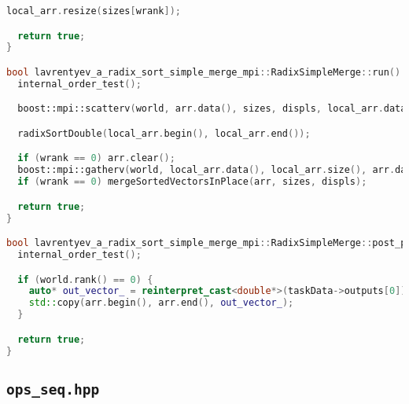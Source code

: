\documentclass[12pt]{article}
\begin{document}
\begin{lstlisting}[language=C++]
  local_arr.resize(sizes[wrank]);

  return true;
}

bool lavrentyev_a_radix_sort_simple_merge_mpi::RadixSimpleMerge::run() {
  internal_order_test();

  boost::mpi::scatterv(world, arr.data(), sizes, displs, local_arr.data(), sizes[wrank], 0);

  radixSortDouble(local_arr.begin(), local_arr.end());

  if (wrank == 0) arr.clear();
  boost::mpi::gatherv(world, local_arr.data(), local_arr.size(), arr.data(), sizes, displs, 0);
  if (wrank == 0) mergeSortedVectorsInPlace(arr, sizes, displs);

  return true;
}

bool lavrentyev_a_radix_sort_simple_merge_mpi::RadixSimpleMerge::post_processing() {
  internal_order_test();

  if (world.rank() == 0) {
    auto* out_vector_ = reinterpret_cast<double*>(taskData->outputs[0]);
    std::copy(arr.begin(), arr.end(), out_vector_);
  }

  return true;
}
\end{lstlisting}

\subsection*{\texttt{ops\_seq.hpp}}
\end{document}

